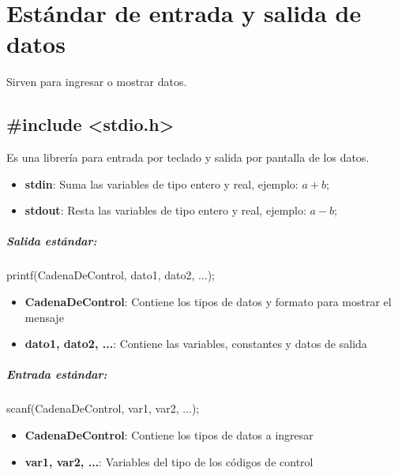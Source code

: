 \chapter[Estándar de entrada y salida de datos]{Estándar de entrada y salida de datos}
\raggedright
Sirven para ingresar o mostrar datos.

\section [Librería stdio.h]{\#include <stdio.h>}
Es una librería para entrada por teclado y salida por pantalla de los datos.
\vspace{1em}
\begin{itemize}
	\item {\textbf{stdin}: Suma las variables de tipo entero y real, ejemplo: {$a + b;$}}
	\item {\textbf{stdout}: Resta las variables de tipo entero y real, ejemplo: {$a - b;$}}
\end{itemize}

\paragraph{Salida estándar:}
{printf(CadenaDeControl, dato1, dato2, ...);}
\begin{itemize}
	\item {\textbf{CadenaDeControl}: Contiene los tipos de datos y formato para mostrar el mensaje} 
	\item {\textbf{dato1, dato2, ...}: Contiene las variables, constantes y datos de salida}
\end{itemize}

\paragraph{Entrada estándar:}
{scanf(CadenaDeControl, var1, var2, ...);}
\begin{itemize}
	\item {\textbf{CadenaDeControl}: Contiene los tipos de datos a ingresar} 
	\item {\textbf{var1, var2, ...}: Variables del tipo de los códigos de control}
\end{itemize}

